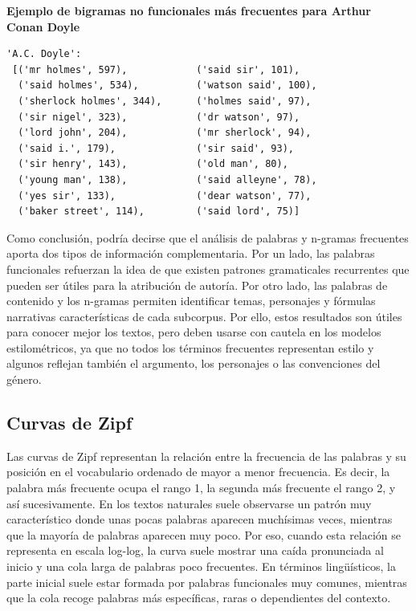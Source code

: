 \documentclass[IB]{TFUOC}%
\begin{document}
\textbf{Ejemplo de bigramas no funcionales más frecuentes para Arthur Conan Doyle}

\begin{verbatim}
'A.C. Doyle':
 [('mr holmes', 597),            ('said sir', 101),
  ('said holmes', 534),          ('watson said', 100),
  ('sherlock holmes', 344),      ('holmes said', 97),
  ('sir nigel', 323),            ('dr watson', 97),
  ('lord john', 204),            ('mr sherlock', 94),
  ('said i.', 179),              ('sir said', 93),
  ('sir henry', 143),            ('old man', 80),
  ('young man', 138),            ('said alleyne', 78),
  ('yes sir', 133),              ('dear watson', 77),
  ('baker street', 114),         ('said lord', 75)]
\end{verbatim}

Como conclusión, podría decirse que el análisis de palabras y n-gramas frecuentes aporta dos tipos de información complementaria. Por un lado, las palabras funcionales refuerzan la idea de que existen patrones gramaticales recurrentes que pueden ser útiles para la atribución de autoría. Por otro lado, las palabras de contenido y los n-gramas permiten identificar temas, personajes y fórmulas narrativas características de cada subcorpus. Por ello, estos resultados son útiles para conocer mejor los textos, pero deben usarse con cautela en los modelos estilométricos, ya que no todos los términos frecuentes representan estilo y algunos reflejan también el argumento, los personajes o las convenciones del género.

\subsection{Curvas de Zipf}

Las curvas de Zipf\cite{zipf1932selected} representan la relación entre la frecuencia de las palabras y su posición en el vocabulario ordenado de mayor a menor frecuencia. Es decir, la palabra más frecuente ocupa el rango 1, la segunda más frecuente el rango 2, y así sucesivamente. En los textos naturales suele observarse un patrón muy característico donde unas pocas palabras aparecen muchísimas veces, mientras que la mayoría de palabras aparecen muy poco. Por eso, cuando esta relación se representa en escala log-log, la curva suele mostrar una caída pronunciada al inicio y una cola larga de palabras poco frecuentes. En términos lingüísticos, la parte inicial suele estar formada por palabras funcionales muy comunes, mientras que la cola recoge palabras más específicas, raras o dependientes del contexto.
\end{document}
